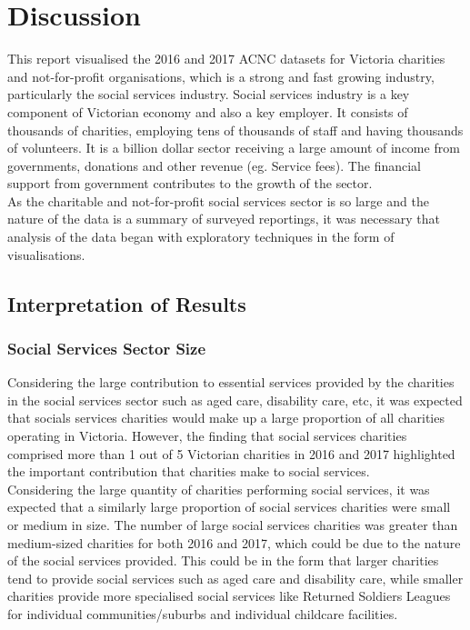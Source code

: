 \documentclass[
  11pt,
]{article}
\begin{document}
\hypertarget{discussion}{%
\section{Discussion}\label{discussion}}

This report visualised the 2016 and 2017 ACNC datasets for Victoria charities and not-for-profit organisations, which is a strong and fast growing industry, particularly the social services industry. Social services industry is a key component of Victorian economy and also a key employer. It consists of thousands of charities, employing tens of thousands of staff and having thousands of volunteers. It is a billion dollar sector receiving a large amount of income from governments, donations and other revenue (eg. Service fees). The financial support from government contributes to the growth of the sector.\\
As the charitable and not-for-profit social services sector is so large and the nature of the data is a summary of surveyed reportings, it was necessary that analysis of the data began with exploratory techniques in the form of visualisations.

\newpage

\hypertarget{interpretation-of-results}{%
\subsection{Interpretation of Results}\label{interpretation-of-results}}

\hypertarget{social-services-sector-size-1}{%
\subsubsection{Social Services Sector Size}\label{social-services-sector-size-1}}

Considering the large contribution to essential services provided by the charities in the social services sector such as aged care, disability care, etc, it was expected that socials services charities would make up a large proportion of all charities operating in Victoria. However, the finding that social services charities comprised more than 1 out of 5 Victorian charities in 2016 and 2017 highlighted the important contribution that charities make to social services.\\
Considering the large quantity of charities performing social services, it was expected that a similarly large proportion of social services charities were small or medium in size. The number of large social services charities was greater than medium-sized charities for both 2016 and 2017, which could be due to the nature of the social services provided. This could be in the form that larger charities tend to provide social services such as aged care and disability care, while smaller charities provide more specialised social services like Returned Soldiers Leagues for individual communities/suburbs and individual childcare facilities.
\end{document}
